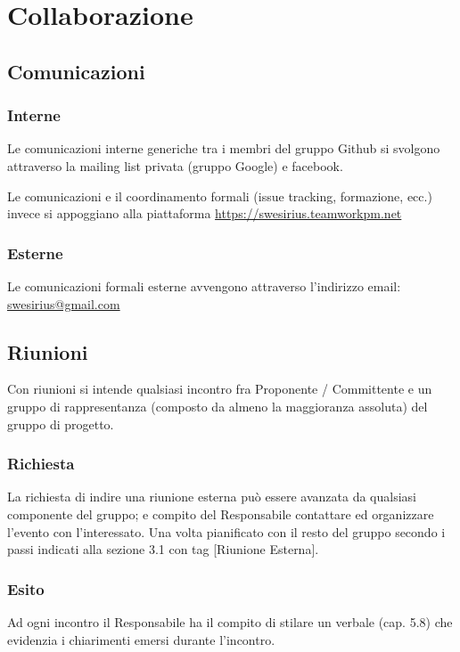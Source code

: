 \section{Collaborazione}

\subsection{Comunicazioni}

\subsubsection{Interne}
Le comunicazioni interne generiche tra i membri del gruppo Github si svolgono attraverso la mailing list privata (gruppo Google) e facebook.

Le comunicazioni e il coordinamento formali (issue tracking, formazione, ecc.) invece si appoggiano alla piattaforma \url{https://swesirius.teamworkpm.net}

\subsubsection{Esterne}
Le comunicazioni formali esterne avvengono attraverso l’indirizzo email: \url{swesirius@gmail.com}


\subsection{Riunioni}
Con riunioni si intende qualsiasi incontro fra Proponente / Committente e un gruppo di rappresentanza (composto da almeno la maggioranza assoluta) del gruppo di progetto.

\subsubsection{Richiesta}

La richiesta di indire una riunione esterna può essere avanzata da qualsiasi componente del gruppo; e compito del Responsabile contattare ed organizzare l'evento con l'interessato. 
Una volta pianificato con il resto del gruppo secondo i passi indicati alla sezione 3.1 con tag [Riunione Esterna].

\subsubsection{Esito}

Ad ogni incontro il Responsabile ha il compito di stilare un verbale (cap. 5.8) che evidenzia i chiarimenti emersi durante l'incontro.

